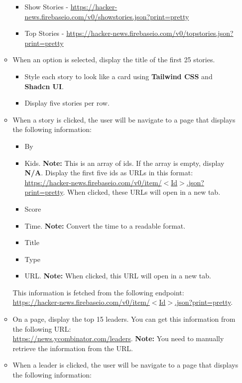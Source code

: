 \documentclass{article}
\begin{document}
\begin{itemize}
\begin{itemize}
\begin{itemize}
		\item Show Stories - \href{https://hacker-news.firebaseio.com/v0/showstories.json?print=pretty}{https://hacker-news.firebaseio.com/v0/showstories.json?print=pretty}
		\item Top Stories - \href{https://hacker-news.firebaseio.com/v0/topstories.json?print=pretty}{https://hacker-news.firebaseio.com/v0/topstories.json?print=pretty}
	\end{itemize}
	\item When an option is selected, display the title of the first 25 stories.
	\begin{itemize}
		\item Style each story to look like a card using \textbf{Tailwind CSS} and \textbf{Shadcn UI}.
		\item Display five stories per row.
	\end{itemize}
	\item When a story is clicked, the user will be navigate to a page that displays the following information:
	\begin{itemize}
		\item By
		\item Kids. \textbf{Note:} This is an array of ids. If the array is empty, display \textbf{N/A}. Display the first five ids as URLs in this format: \href{https://hacker-news.firebaseio.com/v0/item/$<$Id$>$.json?print=pretty}{https://hacker-news.firebaseio.com/v0/item/$<$Id$>$.json?print=pretty}. When clicked, these URLs will open in a new tab. 
		\item Score
		\item Time. \textbf{Note:} Convert the time to a readable format.
		\item Title
		\item Type 
		\item URL. \textbf{Note:} When clicked, this URL will open in a new tab.
	\end{itemize}
	This information is fetched from the following endpoint:\\
	\href{https://hacker-news.firebaseio.com/v0/item/$<$Id$>$.json?print=pretty}{https://hacker-news.firebaseio.com/v0/item/$<$Id$>$.json?print=pretty}.
	\item On a page, display the top 15 leaders. You can get this information from the following URL:\\
	\href{https://news.ycombinator.com/leaders}{https://news.ycombinator.com/leaders}. \textbf{Note:} You need to manually retrieve the information from the URL. 
	\item When a leader is clicked, the user will be navigate to a page that displays the following information:

\end{itemize}
\end{itemize}
\end{document}
